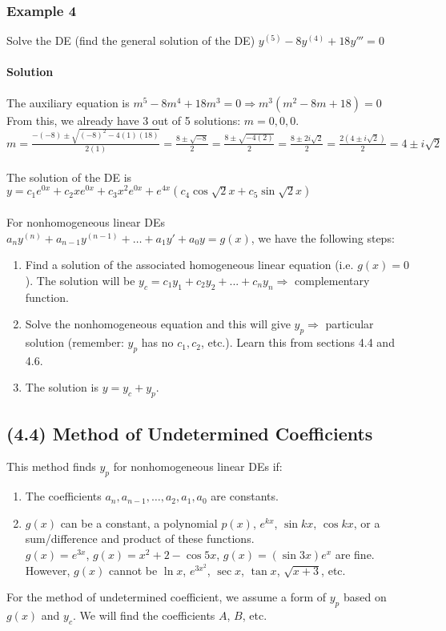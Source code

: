 \documentclass{article}
\begin{document}
\subsubsection{Example 4}
Solve the DE (find the general solution of the DE) $y^{(5)}-8y^{(4)}+18y'''=0$
\paragraph{Solution} The auxiliary equation is $m^5-8m^4+18m^3=0\Rightarrow m^3(m^2-8m+18)=0$
\\From this, we already have 3 out of 5 solutions: $m=0,0,0$.
\\$m=\frac{-(-8)\pm\sqrt{(-8)^2-4(1)(18)}}{2(1)}=\frac{8\pm\sqrt{-8}}{2}=\frac{8\pm\sqrt{-4(2)}}{2}=\frac{8\pm2i\sqrt{2}}{2}
=\frac{2(4\pm i\sqrt{2})}{2}=4\pm i\sqrt{2}$
\\\\The solution of the DE is $y=c_1e^{0x}+c_2xe^{0x}+c_3x^2e^{0x}+e^{4x}(c_4\cos\sqrt{2}x+c_5\sin\sqrt{2}x)$
\\\\For nonhomogeneous linear DEs $a_ny^{(n)}+a_{n-1}y^{(n-1)}+\dots+a_1y'+a_0y=g(x)$, we have the following steps: \begin{enumerate}
    \itemsep 0em
    \item Find a solution of the associated homogeneous linear equation (i.e. $g(x)=0$). The solution will be $y_c=c_1y_1+c_2y_2+...+c_ny_n\Rightarrow$ complementary function.
    \item Solve the nonhomogeneous equation and this will give $y_p\Rightarrow$ particular solution (remember: $y_p$ has no $c_1,c_2$, etc.). Learn this from sections 4.4 and 4.6.
    \item The solution is $y=y_c+y_p$.
\end{enumerate}

\subsection{(4.4) Method of Undetermined Coefficients}
This method finds $y_p$ for nonhomogeneous linear DEs if: \begin{enumerate}
    \itemsep 0em
    \item The coefficients $a_n, a_{n-1},\dots,a_2,a_1,a_0$ are constants.
    \item $g(x)$ can be a constant, a polynomial $p(x)$, $e^{kx}$, $\sin{kx}$, $\cos{kx}$,
        or a sum/difference and product of these functions.
        \\$g(x)=e^{3x}$, $g(x)=x^2+2-\cos{5x}$, $g(x)=(\sin3x)e^{x}$ are fine.
        However, $g(x)$ cannot be $\ln x$, $e^{3x^2}$, $\sec x$, $\tan x$, $\sqrt{x+3}$, etc.
\end{enumerate}
For the method of undetermined coefficient, we assume a form of $y_p$ based on $g(x)$ and $y_c$.
We will find the coefficients $A$, $B$, etc.
\end{document}
